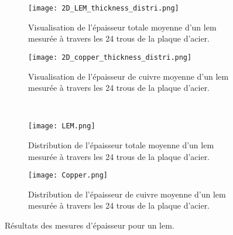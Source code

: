                 \begin{figure}[htpb]
                    \begin{subfigure}[t]{0.48\textwidth}
                        \texttt{[image: 2D\_LEM\_thickness\_distri.png]}
                        \caption{Visualisation de l'épaisseur totale moyenne d'un \gls{lem} mesurée à travers les 24 trous de la plaque d'acier.}
                        \label{fig::distri_24_trou_lem_2D}
                    \end{subfigure}
                    \hfill
                    \begin{subfigure}[t]{0.48\textwidth}
                        \texttt{[image: 2D\_copper\_thickness\_distri.png]}
                        \caption{Visualisation de l'épaisseur de cuivre moyenne d'un \gls{lem} mesurée à travers les 24 trous de la plaque d'acier.}
                        \label{fig::distri_24_trou_cuivre_2D}
                    \end{subfigure}\\
                    \begin{subfigure}[b]{0.48\textwidth}
                        \texttt{[image: LEM.png]}
                        \caption{Distribution de l'épaisseur totale moyenne d'un \gls{lem} mesurée à travers les 24 trous de la plaque d'acier.}
                        \label{fig::distri_24_trou_lem_1D}
                    \end{subfigure}
                    \hfill
                    \begin{subfigure}[b]{0.48\textwidth}
                        \texttt{[image: Copper.png]}
                        \caption{Distribution de l'épaisseur de cuivre moyenne d'un \gls{lem} mesurée à travers les 24 trous de la plaque d'acier.}
                        \label{fig::distri_24_trou_cuivre_1D}
                    \end{subfigure}
                    \caption[Résultats des mesures d'épaisseur pour un \gls{lem}.]{Résultats des mesures d'épaisseur pour un \gls{lem}.}
                    \label{fig::distri_epaisseur_1_lem}
                \end{figure}
                
